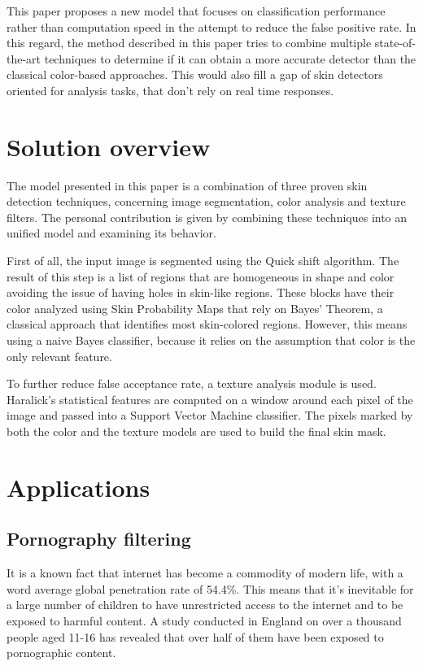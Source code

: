 \documentclass[12pt]{report}
\begin{document}
	This paper proposes a new model that focuses on classification performance rather than computation speed in the attempt to reduce the false positive rate. In this regard, the method described in this paper tries to combine multiple state-of-the-art techniques to determine if it can obtain a more accurate detector than the classical color-based approaches. This would also fill a gap of skin detectors oriented for analysis tasks, that don't rely on real time responses.
	
	\section{Solution overview}
	The model presented in this paper is a combination of three proven skin detection techniques, concerning image segmentation, color analysis and texture filters. The personal contribution is given by combining these techniques into an unified model and examining its behavior.
	
	First of all, the input image is segmented using the Quick shift algorithm. The result of this step is a list of regions that are homogeneous in shape and color avoiding the issue of having holes in skin-like regions. These blocks have their color analyzed using Skin Probability Maps that rely on Bayes' Theorem, a classical approach that identifies most skin-colored regions. However, this means using a naive Bayes classifier, because it relies on the assumption that color is the only relevant feature. 
	
	To further reduce false acceptance rate, a texture analysis module is used. Haralick's statistical features are computed on a window around each pixel of the image and passed into a Support Vector Machine classifier. The pixels marked by both the color and the texture models are used to build the final skin mask.
	
	\section{Applications}
	
	\subsection{Pornography filtering}
	It is a known fact that internet has become a commodity of modern life, with a word average global penetration rate of 54.4\%\cite{internet_stats}. This means that it's inevitable for a large number of children to have unrestricted access to the internet and to be exposed to harmful content. A study conducted in England\cite{children_exposure} on over a thousand people aged 11-16 has revealed that over half of them have been exposed to pornographic content. 
	
\end{document}
